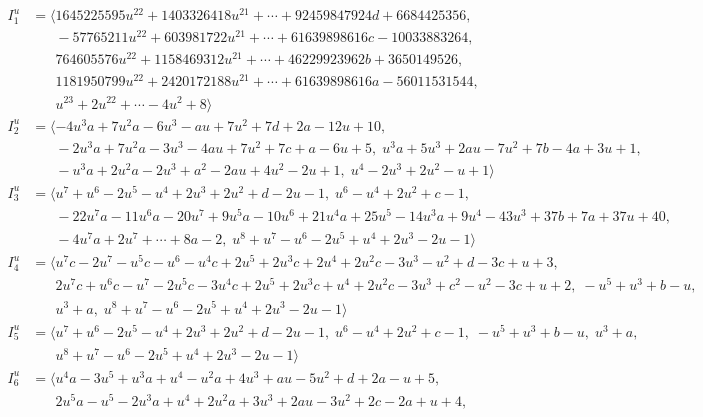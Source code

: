 \documentclass[1p]{elsarticle_modified}
\theoremstyle{definition}
\begin{document}
\begin{align*}
I^u_{1}&=\langle 
1645225595 u^{22}+1403326418 u^{21}+\cdots+92459847924 d+6684425356,\\
\phantom{I^u_{1}}&\phantom{= \langle  }-57765211 u^{22}+603981722 u^{21}+\cdots+61639898616 c-10033883264,\\
\phantom{I^u_{1}}&\phantom{= \langle  }764605576 u^{22}+1158469312 u^{21}+\cdots+46229923962 b+3650149526,\\
\phantom{I^u_{1}}&\phantom{= \langle  }1181950799 u^{22}+2420172188 u^{21}+\cdots+61639898616 a-56011531544,\\
\phantom{I^u_{1}}&\phantom{= \langle  }u^{23}+2 u^{22}+\cdots-4 u^2+8\rangle \\
I^u_{2}&=\langle 
-4 u^3 a+7 u^2 a-6 u^3- a u+7 u^2+7 d+2 a-12 u+10,\\
\phantom{I^u_{2}}&\phantom{= \langle  }-2 u^3 a+7 u^2 a-3 u^3-4 a u+7 u^2+7 c+a-6 u+5,\;u^3 a+5 u^3+2 a u-7 u^2+7 b-4 a+3 u+1,\\
\phantom{I^u_{2}}&\phantom{= \langle  }- u^3 a+2 u^2 a-2 u^3+a^2-2 a u+4 u^2-2 u+1,\;u^4-2 u^3+2 u^2- u+1\rangle \\
I^u_{3}&=\langle 
u^7+u^6-2 u^5- u^4+2 u^3+2 u^2+d-2 u-1,\;u^6- u^4+2 u^2+c-1,\\
\phantom{I^u_{3}}&\phantom{= \langle  }-22 u^7 a-11 u^6 a-20 u^7+9 u^5 a-10 u^6+21 u^4 a+25 u^5-14 u^3 a+9 u^4-43 u^3+37 b+7 a+37 u+40,\\
\phantom{I^u_{3}}&\phantom{= \langle  }-4 u^7 a+2 u^7+\cdots+8 a-2,\;u^8+u^7- u^6-2 u^5+u^4+2 u^3-2 u-1\rangle \\
I^u_{4}&=\langle 
u^7 c-2 u^7- u^5 c- u^6- u^4 c+2 u^5+2 u^3 c+2 u^4+2 u^2 c-3 u^3- u^2+d-3 c+u+3,\\
\phantom{I^u_{4}}&\phantom{= \langle  }2 u^7 c+u^6 c- u^7-2 u^5 c-3 u^4 c+2 u^5+2 u^3 c+u^4+2 u^2 c-3 u^3+c^2- u^2-3 c+u+2,\;- u^5+u^3+b- u,\\
\phantom{I^u_{4}}&\phantom{= \langle  }u^3+a,\;u^8+u^7- u^6-2 u^5+u^4+2 u^3-2 u-1\rangle \\
I^u_{5}&=\langle 
u^7+u^6-2 u^5- u^4+2 u^3+2 u^2+d-2 u-1,\;u^6- u^4+2 u^2+c-1,\;- u^5+u^3+b- u,\;u^3+a,\\
\phantom{I^u_{5}}&\phantom{= \langle  }u^8+u^7- u^6-2 u^5+u^4+2 u^3-2 u-1\rangle \\
I^u_{6}&=\langle 
u^4 a-3 u^5+u^3 a+u^4- u^2 a+4 u^3+a u-5 u^2+d+2 a- u+5,\\
\phantom{I^u_{6}}&\phantom{= \langle  }2 u^5 a- u^5-2 u^3 a+u^4+2 u^2 a+3 u^3+2 a u-3 u^2+2 c-2 a+u+4,\\

\end{align*}
\end{document}
